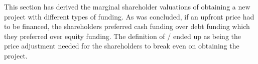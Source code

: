 \documentclass[main.tex]{subfiles}
\begin{document}
    This section has derived the marginal shareholder valuations of obtaining a new project
    with different types of funding.
    As was concluded, if an upfront price had to be financed,
    the shareholders preferred cash funding over debt funding
    which they preferred over equity funding.
    The definition of \FVA/ ended up as being the price adjustment needed
    for the shareholders to break even on obtaining the project.
\end{document}
